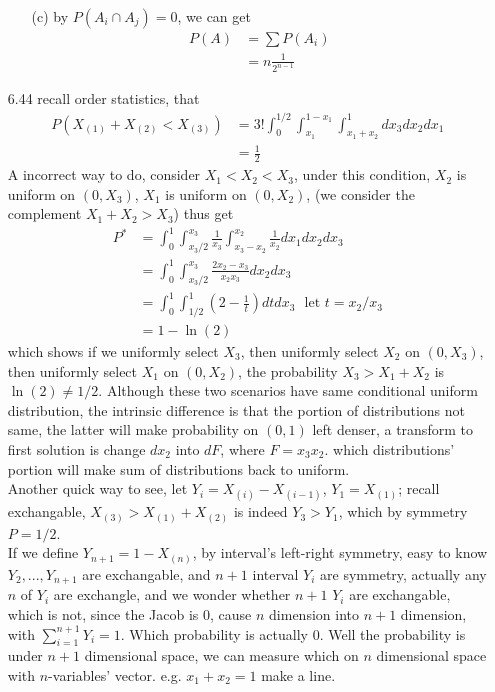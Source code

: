 \documentclass[paper=a4, fontsize=11pt]{scrartcl} %
\numberwithin{equation}{section} %
\numberwithin{figure}{section} %
\numberwithin{table}{section} %
\begin{document}
\begin{itemize}
\begin{itemize}
		\item[(c)] by $P(A_i\cap A_j) = 0$, we can get
		\begin{align}
			P(A) &= \sum P(A_i) \\
				&= n \frac{1}{2^{n-1}}
		\end{align}
	\end{itemize}
	\item[6.44] recall order statistics, that
	\begin{align}
		P(X_{(1)}+X_{(2)} < X_{(3)}) &= 3!\int_0^{1/2} \int_{x_1}^{1-x_1}\int_{x_1+x_2}^{1}dx_3 dx_2 dx_1 \\
			&= \frac{1}{2}
	\end{align}
	A incorrect way to do, consider $X_1<X_2<X_3$, under this condition, $X_2$ is uniform on $(0,X_3)$, $X_1$ is uniform on $(0,X_2)$, (we consider the complement $X_1+X_2>X_3$) thus get
	\begin{align}
		P^* &= \int_0^1 \int_{x_3/2}^{x_3} \frac{1}{x_3}\int_{x_3-x_2}^{x_2}\frac{1}{x_2} dx_1dx_2dx_3\\
			&= \int_0^1 \int_{x_3/2}^{x_3} \frac{2x_2 - x_3}{x_2 x_3} dx_2dx_3 \\
			&= \int_0^1 \int_{1/2}^{1} (2 - \frac{1}{t})dt dx_3 \ \ \  \text{let $t=x_2/x_3$}\\
			&= 1 - \ln(2)
	\end{align}
	which shows if we uniformly select $X_3$, then uniformly select $X_2$ on $(0,X_3)$, then uniformly select $X_1$ on $(0,X_2)$, the probability $X_3>X_1+X_2$ is $\ln(2)\neq 1/2$. Although these two scenarios have same conditional uniform distribution, the intrinsic difference is that the portion of distributions not same, the latter will make probability on $(0,1)$ left denser, a transform to first solution is change $dx_2$ into $dF$, where $F=x_3x_2$. which distributions' portion will make sum of distributions back to uniform.\\
	Another quick way to see, let $Y_i= X_{(i)}-X_{(i-1)}$, $Y_1=X_{(1)}$; recall exchangable, $X_{(3)}>X_{(1)}+X_{(2)}$ is indeed $Y_3>Y_1$, which by symmetry $P=1/2$.\\
	If we define $Y_{n+1}=1 -X_{(n)}$, by interval's left-right symmetry, easy to know $Y_2,...,Y_{n+1}$ are exchangable, and $n+1$ interval $Y_i$ are symmetry, actually any $n$ of $Y_i$ are exchangle, and we wonder whether $n+1$ $Y_i$ are exchangable, which is not, since the Jacob is 0, cause $n$ dimension into $n+1$ dimension, with $\sum_{i=1}^{n+1} Y_i =1$. Which probability is actually 0. Well the probability is under $n+1$ dimensional space, we can measure which on $n$ dimensional space with $n$-variables' vector. e.g. $x_1+x_2=1$ make a line.\\

\end{itemize}
\end{document}
